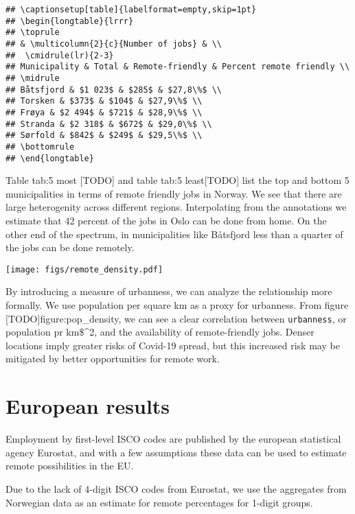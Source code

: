 \documentclass[11pt,]{article}
\begin{document}
\begin{verbatim}
## \captionsetup[table]{labelformat=empty,skip=1pt}
## \begin{longtable}{lrrr}
## \toprule
## & \multicolumn{2}{c}{Number of jobs} & \\ 
##  \cmidrule(lr){2-3}
## Municipality & Total & Remote-friendly & Percent remote friendly \\ 
## \midrule
## Båtsfjord & $1 023$ & $285$ & $27,8\%$ \\ 
## Torsken & $373$ & $104$ & $27,9\%$ \\ 
## Frøya & $2 494$ & $721$ & $28,9\%$ \\ 
## Stranda & $2 318$ & $672$ & $29,0\%$ \\ 
## Sørfold & $842$ & $249$ & $29,5\%$ \\ 
## \bottomrule
## \end{longtable}
\end{verbatim}

Table tab:5 most {[}TODO{]} and table tab:5 least{[}TODO{]} list the top
and bottom 5 municipalities in terms of remote friendly jobs in Norway.
We see that there are large heterogenity across different regions.
Interpolating from the annotations we estimate that 42 percent of the
jobs in Oslo can be done from home. On the other end of the spectrum, in
municipalities like Båtsfjord less than a quarter of the jobs can be
done remotely.

\texttt{[image: figs/remote\_density.pdf]}

By introducing a measure of urbanness, we can analyze the relationship
more formally. We use population per square km as a proxy for urbanness.
From figure {[}TODO{]}figure:pop\_density, we can see a clear
correlation between \texttt{urbanness}, or population pr km\$\^{}2, and
the availability of remote-friendly jobs. Denser locations imply greater
risks of Covid-19 spread, but this increased risk may be mitigated by
better opportunities for remote work.

\hypertarget{european-results}{%
\section{European results}\label{european-results}}

Employment by first-level ISCO codes are published by the european
statistical agency Eurostat, and with a few assumptions these data can
be used to estimate remote possibilities in the EU.

Due to the lack of 4-digit ISCO codes from Eurostat, we use the
aggregates from Norwegian data as an estimate for remote percentages for
1-digit groups.
\end{document}
